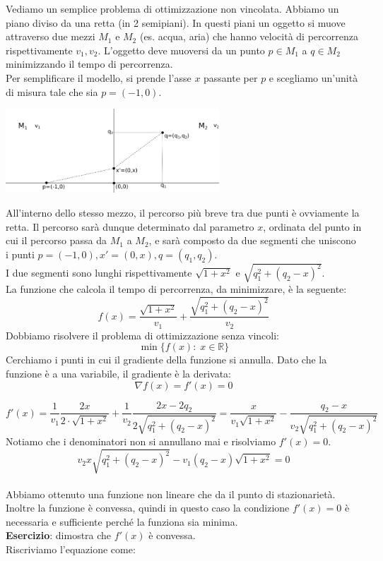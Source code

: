 \begin{example}
\label{esempio-prog-nv} Vediamo un semplice problema di ottimizzazione
non vincolata. Abbiamo un piano diviso da una retta (in 2
semipiani). In questi piani un oggetto si muove attraverso due mezzi
$M_1$ e $M_2$ (es. acqua, aria) che hanno velocit\`a di percorrenza
rispettivamente $v_1, v_2$. L'oggetto deve muoversi da un punto $p \in
M_1$ a $q \in M_2$ minimizzando il tempo di percorrenza.\\ Per
semplificare il modello, si prende l'asse $x$ passante per $p$ e
scegliamo un'unit\`a di misura tale che sia $p=(-1,0)$.

\centerline{\includegraphics[width=0.60\textwidth]{imgs/esempio-prog-nv.png}}

All'interno dello stesso mezzo, il percorso pi\`u breve tra due punti \`e
ovviamente la retta. Il percorso sar\`a dunque determinato dal parametro
$x$, ordinata del punto in cui il percorso passa da $M_1$ a $M_2$, e
sar\`a composto da due segmenti che uniscono i punti $p=(-1,0),
x'=(0,x), q=(q_1, q_2)$.\\ I due segmenti sono lunghi rispettivamente
$\sqrt{1+x^2}$ e $\sqrt{q_1^2 + (q_2 - x)^2}$.\\ La funzione che
calcola il tempo di percorrenza, da minimizzare, \`e la seguente:
$$f(x) =  \frac{\sqrt{1+x^2}}{v_1} + \frac{\sqrt{q_1^2 + (q_2 - x)^2}}{v_2}$$
Dobbiamo risolvere il problema di ottimizzazione senza vincoli:
$$ \min\{f(x):\; x \in \mathbb{R}\}$$
Cerchiamo i punti in cui il gradiente della funzione si annulla. Dato
che la funzione \`e a una variabile, il gradiente \`e la derivata:
$$\nabla f(x)= f'(x)=0$$

$$f'(x) = \frac{1}{v_1} \frac{2x}{2 \cdot \sqrt{1+x^2}} + \frac{1}{v_2} \frac{2x - 2q_2}{2\sqrt{q_1^2 + (q_2 - x)^2}} = \frac{x}{v_1\sqrt{1+x^2}} - \frac{{q_2 - x}}{v_2 \sqrt{q_1^{2} + (q_2 -x)^2}}
$$
Notiamo che i denominatori non si annullano mai e risolviamo $f'(x) =
0$.
$$ v_2 x \sqrt{q_1^2 + (q_2 -x)^2} - v_1(q_2 -x)\sqrt{1+x^2}=0$$ \\
Abbiamo ottenuto una funzione non lineare che da il punto di
stazionariet\`a. Inoltre la funzione \`e convessa, quindi in questo caso
la condizione $f'(x)=0$ \`e necessaria e sufficiente perch\'e la funziona
sia minima. \\ \textbf{Esercizio}: dimostra che $f'(x)$ \`e convessa.\\
Riscriviamo l'equazione come:


\end{example}
